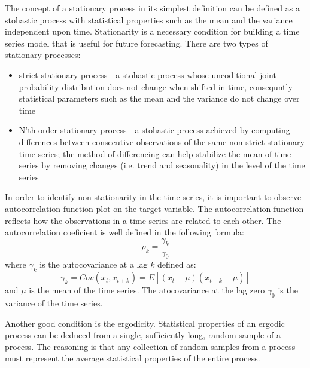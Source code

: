 The concept of a stationary process in its simplest definition can be defined as a stohastic process with statistical properties such as the mean and the variance independent upon time. 
Stationarity is a necessary condition for building a time series model that is useful for future forecasting. There are two types of stationary processes: 
\begin{itemize}
    \item strict stationary process - a stohastic process whose uncoditional joint probability distribution does not change when shifted in time, consequntly statistical parameters such as the mean and the variance do not change over time
    \item N'th order stationary process - a stohastic process achieved by computing differences between consecutive observations of the same non-strict stationary time series; the method of differencing can help stabilize the mean of time series by removing changes (i.e. trend and seasonality) in the level of the time series
\end{itemize}
In order to identify non-stationarity in the time series, it is important to observe autocorrelation function plot on the target variable. 
The autocorrelation function reflects how the observations in a time series are related to each other. 
The autocorrelation coeficient is well defined in the following formula:
\begin{equation}
    \rho_{k} = \frac{\gamma_{k}}{\gamma_{0}}
\end{equation}
where $\gamma_{k}$ is the autocovariance at a lag $k$ defined as:
\begin{equation}
    \gamma_{k} = Cov(x_{t}, x_{t+k}) = E[(x_{t} - \mu)(x_{t+k} - \mu)]
\end{equation}
and $\mu$ is the mean of the time series.
The atocovariance at the lag zero $\gamma_{0}$ is the variance of the time series. \cite{Adhikari_timeseries}

Another good condition is the ergodicity. 
Statistical properties of an ergodic process can be deduced from a single, sufficiently long, random sample of a process.
The reasoning is that any collection of random samples from a process must represent the average statistical properties of the entire process.

